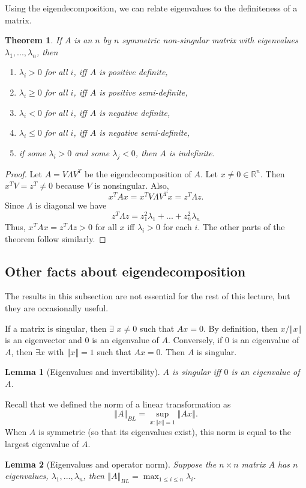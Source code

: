 \documentclass[12pt,reqno]{amsart}
\newtheorem{theorem}{Theorem}[section]
\newtheorem{lemma}{Lemma}[section]
\theoremstyle{definition}
\def\R{\mathbb{R}}
\newcommand{\norm}[1]{\left\Vert {#1} \right\Vert}
\begin{document}
Using the eigendecomposition, we can relate eigenvalues to the
definiteness of a matrix.
\begin{theorem}
  If $A$ is an $n$ by $n$ symmetric non-singular matrix with
  eigenvalues $\lambda_1, ..., \lambda_n$, then
  \begin{enumerate}
  \item $\lambda_i > 0$ for all $i$, iff $A$ is positive definite,
  \item $\lambda_i \geq 0$ for all $i$, iff $A$ is positive semi-definite,
  \item $\lambda_i < 0$ for all $i$, iff $A$ is negative definite,    
  \item $\lambda_i \leq 0$ for all $i$, iff $A$ is negative
    semi-definite,
  \item if some $\lambda_i > 0$ and some $\lambda_j < 0$, then $A$ is
    indefinite.
  \end{enumerate}
\end{theorem}
\begin{proof}
  Let $A = V \Lambda V^T$ be the eigendecomposition of $A$. Let $x
  \neq 0 \in \R^n$. Then $x^T V = z^T \neq 0$ because $V$ is
  nonsingular. Also, 
  \[ x^T A x = x^T V \Lambda V^T x = z^T \Lambda z. \]
  Since $\Lambda$ is diagonal we have
  \[ z^T \Lambda z = z_1^2 \lambda_1 + ... + z_n^2 \lambda_n \]
  Thus, $x^T A  x= z^T \Lambda z > 0$ for all $x$ iff $\lambda_i>0$
  for each $i$. The other parts of the theorem follow similarly. 
\end{proof}

\subsection{Other facts about eigendecomposition}

The results in this subsection are not essential for the rest of this
lecture, but they are occasionally useful.

If a matrix is singular, then $\exists$ $x \neq 0$ such that $Ax =
0$. By definition, then $x/\norm{x}$ is an eigenvector and $0$ is an 
eigenvalue of $A$. Conversely, if $0$ is an eigenvalue of $A$, then
$\exists x$ with $\norm{x} = 1$ such that $Ax = 0$. Then $A$ is
singular. 
\begin{lemma}[Eigenvalues and invertibility] 
  $A$ is singular iff $0$ is an eigenvalue of $A$.
\end{lemma}

Recall that we defined the norm of a linear transformation as 
\[ \norm{A}_{BL} = \sup_{x : \norm{x} = 1} \norm{Ax}. \]
When $A$ is symmetric (so that its eigenvalues exist), this norm is
equal to the largest eigenvalue of $A$.
\begin{lemma}[Eigenvalues and operator norm]
  Suppose the $n \times n$ matrix $A$ has $n$ eigenvalues, $\lambda_1,
  ..., \lambda_n$, then $\norm{A}_{BL} = \max_{1\leq i \leq n}
  \lambda_i$.
\end{lemma}
\end{document}
